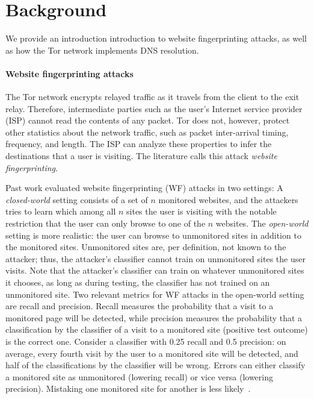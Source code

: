 \section{Background}
\label{sec:background}
We provide an introduction introduction to website fingerprinting
attacks, as well as how
the Tor network implements DNS resolution.

\paragraph{Website fingerprinting attacks}
The Tor network encrypts relayed traffic as it travels from the client
to the exit relay.  Therefore, intermediate parties such as the user's
Internet service provider (ISP) cannot read the contents of any packet.
Tor does not, however, protect other statistics about the network
traffic, such as packet inter-arrival timing, frequency, and length.
The ISP can analyze these properties to infer the destinations that a
user is visiting.  The literature calls this attack \emph{website
  fingerprinting}.  

Past work evaluated website fingerprinting (WF) attacks in two settings:
A {\em closed-world} setting consists of a set of $n$ {monitored}
websites, and the attackers tries to learn which among all $n$ sites the
user is visiting with the notable restriction that the user can only
browse to one of the $n$ websites.  The {\em open-world} setting is more
realistic: the user can browse to {unmonitored} sites in addition to the
monitored sites. Unmonitored sites are, per definition, not known to the
attacker; thus, the attacker's classifier cannot train on unmonitored
sites the user visits. Note that the attacker's classifier can train on
whatever unmonitored sites it chooses, as long as during testing, the
classifier has not trained on an unmonitored site. Two relevant metrics
for WF attacks in the open-world 
setting are recall and precision.  Recall measures the probability that
a visit to a monitored page will be detected, while precision measures
the probability that a classification by the classifier of a visit to a
monitored site (positive test outcome) is the correct one. Consider a
classifier with 0.25 recall and 0.5 precision: on average, every fourth
visit by the user to a monitored site will be detected, and half of the
classifications by the classifier will be wrong. Errors can
either classify a monitored site as
unmonitored (lowering recall) or vice versa (lowering precision).
Mistaking one monitored site for another is less
likely~\cite{WangThesis}.

